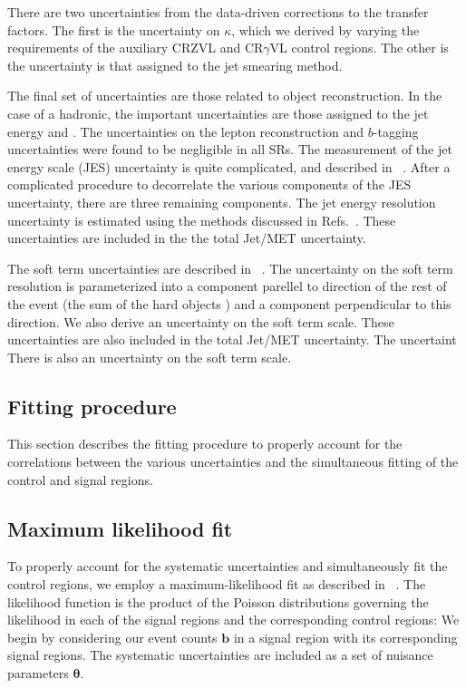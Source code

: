 There are two uncertainties from the data-driven corrections to the transfer factors.
The first is the uncertainty on $\kappa$, which we derived by varying the \met requirements of the auxiliary CRZVL and CR$\gamma$VL control regions.
The other is the uncertainty is that assigned to the jet smearing method.

The final set of uncertainties are those related to object reconstruction.
In the case of a hadronic, the important uncertainties are those assigned to the jet energy and \met.
The uncertainties on the lepton reconstruction and $b$-tagging uncertainties were found to be negligible in all SRs.
The measurement of the jet energy scale (JES) uncertainty is quite complicated, and described in ~\cite{Aad:2011he,Aad:2012vm,ATL-PHYS-PUB-2015-015}.
After a complicated procedure to decorrelate the various components of the JES uncertainty, there are three remaining components.
The jet energy resolution uncertainty is estimated using the methods discussed in Refs.~\cite{Aad:2012ag,ATL-PHYS-PUB-2015-015}.
These uncertainties are included in the the total Jet/MET uncertainty.

The \met soft term uncertainties are described in ~\cite{PERF-2014-04,ATL-PHYS-PUB-2015-023,ATL-PHYS-PUB-2015-027}.
The uncertainty on the \met soft term resolution is parameterized into a component parellel to direction of the rest of the event (the sum of the hard objects \pt) and a component perpendicular to this direction.
We also derive an uncertainty on the \met soft term scale.
These uncertainties are also included in the total Jet/MET uncertainty.
The uncertaint
There is also an uncertainty on the \met soft term scale.

\subsection{Fitting procedure}

This section describes the fitting procedure to properly account for the correlations between the various uncertainties and the simultaneous fitting of the control and signal regions.

\subsection{Maximum likelihood fit}

To properly account for the systematic uncertainties and simultaneously fit the control regions, we employ a maximum-likelihood fit as described in ~\cite{Baak:2014wma}.
The likelihood function \Lagr is the product of the Poisson distributions governing the likelihood in each of the signal regions and the corresponding control regions:
We begin by considering our event counts  $\bm{b}$ in a signal region with its corresponding signal regions.
The systematic uncertainties are included as a set of nuisance parameters $\bm{\theta}$.

